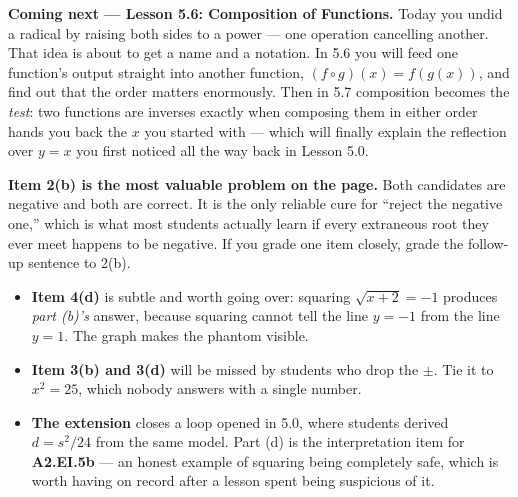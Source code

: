 \documentclass[10pt]{article}
\begin{document}
\begin{spiralbox}
\textbf{Coming next --- Lesson 5.6: Composition of Functions.} Today you undid a radical by raising
both sides to a power --- one operation cancelling another. That idea is about to get a name and a
notation. In 5.6 you will feed one function's output straight into another function,
$(f\circ g)(x)=f(g(x))$, and find out that the order matters enormously. Then in 5.7 composition
becomes the \emph{test}: two functions are inverses exactly when composing them in either order
hands you back the $x$ you started with --- which will finally explain the reflection over $y=x$
you first noticed all the way back in Lesson 5.0.
\end{spiralbox}

\begin{teachernote}
\small \textbf{Item 2(b) is the most valuable problem on the page.} Both candidates are negative and
both are correct. It is the only reliable cure for ``reject the negative one,'' which is what most
students actually learn if every extraneous root they ever meet happens to be negative. If you grade
one item closely, grade the follow-up sentence to 2(b).
\begin{itemize}[leftmargin=1.3em, nosep]
  \item \textbf{Item 4(d)} is subtle and worth going over: squaring $\sqrt{x+2}=-1$ produces
        \emph{part (b)'s} answer, because squaring cannot tell the line $y=-1$ from the line $y=1$.
        The graph makes the phantom visible.
  \item \textbf{Item 3(b) and 3(d)} will be missed by students who drop the $\pm$. Tie it to
        $x^{2}=25$, which nobody answers with a single number.
  \item \textbf{The extension} closes a loop opened in 5.0, where students derived $d=s^{2}/24$ from
        the same model. Part (d) is the interpretation item for \textbf{A2.EI.5b} --- an honest
        example of squaring being completely safe, which is worth having on record after a lesson
        spent being suspicious of it.
\end{itemize}
\end{teachernote}
\end{document}
